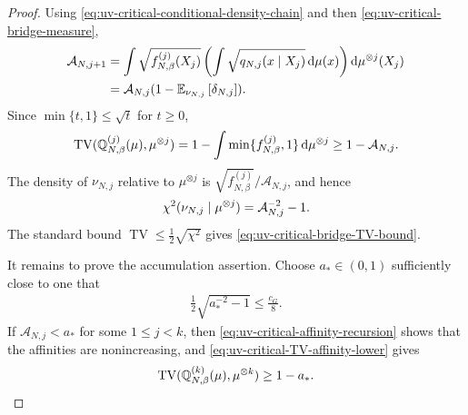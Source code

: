 \documentclass[11pt,reqno]{amsart}
\numberwithin{equation}{section}
\theoremstyle{plain}
\theoremstyle{remark}
\DeclarePairedDelimiter{\pa}{\lparen}{\rparen}
\newcommand{\md}{\mathrm{d}}
\newcommand{\E}{{\mathbb{E}}}
\newcommand{\Q}{{\mathbb{Q}}}
\newcommand{\be}{\beta}
\newcommand{\Chi}{\chi^2}
\newcommand{\TV}{\operatorname{TV}}
\begin{document}
\begin{proof}
Using \eqref{eq:uv-critical-conditional-density-chain} and then \eqref{eq:uv-critical-bridge-measure},
\begin{align}
 \mathcal A_{N,j+1}
 &=\int\sqrt{f_{N,\be}^{(j)}(X_j)}
 \left(\int\sqrt{q_{N,j}(x\mid X_j)}\,\md\mu(x)\right)
 \md\mu^{\otimes j}(X_j)\notag\\
 &=\mathcal A_{N,j}\pa{1-\E_{\nu_{N,j}}\left[\delta_{N,j}\right]}.
 \label{eq:uv-critical-affinity-recursion-proof}
\end{align}
Since \(\min\{t,1\}\le\sqrt t\) for \(t\ge0\),
\begin{align}\label{eq:uv-critical-TV-affinity-proof}
 \TV\pa{\Q_{N,\be}^{(j)}(\mu),\mu^{\otimes j}}
 =1-\int\min\{f_{N,\be}^{(j)},1\}\,\md\mu^{\otimes j}
 \ge1-\mathcal A_{N,j}.
\end{align}
The density of \(\nu_{N,j}\) relative to \(\mu^{\otimes j}\) is \(\sqrt{f_{N,\be}^{(j)}}/\mathcal A_{N,j}\), and hence
\begin{align}\label{eq:uv-critical-bridge-chi-square}
 \Chi\pa{\nu_{N,j}\mid\mu^{\otimes j}}
 =\mathcal A_{N,j}^{-2}-1.
\end{align}
The standard bound \(\TV\le\frac12\sqrt{\Chi}\) gives \eqref{eq:uv-critical-bridge-TV-bound}.

It remains to prove the accumulation assertion.  Choose \(a_*\in(0,1)\) sufficiently close to one that
\begin{align}\label{eq:uv-critical-a-star-choice}
 \frac12\sqrt{a_*^{-2}-1}\le\frac{c_G}{8}.
\end{align}
If \(\mathcal A_{N,j}<a_*\) for some \(1\le j<k\), then \eqref{eq:uv-critical-affinity-recursion} shows that the affinities are nonincreasing, and \eqref{eq:uv-critical-TV-affinity-lower} gives
\begin{align}\label{eq:uv-critical-affinity-dichotomy-large-TV}
 \TV\pa{\Q_{N,\be}^{(k)}(\mu),\mu^{\otimes k}}
 \ge1-a_*.
\end{align}


\end{proof}
\end{document}
